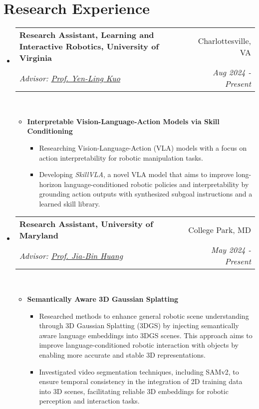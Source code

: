 \documentclass[letterpaper,11pt]{article}
\makeatletter
\newcommand{\Date}[1]{\textit{\small #1}}
\newcommand{\resumeSubheading}[4]{
  \item
    \begin{tabular*}{0.9798\textwidth}{l@{\extracolsep{\fill}}r} %
      \textbf{#1} & #2 \\
      \textit{\small#3} & \Date{#4} \\
    \end{tabular*}\
}
\makeatother
\begin{document}
\section{Research Experience}
\begin{itemize}
  \resumeSubheading{Research Assistant, Learning and Interactive Robotics, University of Virginia}{Charlottesville, VA}
  {Advisor: \href{https://yenlingkuo.com/}{Prof. Yen-Ling Kuo}}{Aug 2024 - Present}
  \begin{itemize}
    \item \textbf{Interpretable Vision-Language-Action Models via Skill Conditioning}
          \begin{itemize}
            \item Researching Vision-Language-Action (VLA) models with a focus on action interpretability for robotic manipulation tasks.
            \item Developing \textit{SkillVLA}, a novel VLA model that aims to improve long-horizon language-conditioned
                  robotic policies and interpretability by grounding action outputs with synthesized subgoal instructions and a learned skill library.
          \end{itemize}
  \end{itemize}

  \resumeSubheading{Research Assistant, University of Maryland}{College Park, MD}
  {Advisor: \href{https://jbhuang0604.github.io/}{Prof. Jia-Bin Huang}}{May 2024 - Present}
  \begin{itemize}
    \item \textbf{Semantically Aware 3D Gaussian Splatting}
          \begin{itemize}
            \item Researched methods to enhance general robotic scene understanding through 3D Gaussian Splatting (3DGS) by injecting semantically aware language embeddings into 3DGS scenes. This approach aims to improve language-conditioned robotic interaction with objects by enabling more accurate and stable 3D representations.
            \item Investigated video segmentation techniques, including SAMv2, to ensure temporal consistency in the integration of 2D training data into 3D scenes, facilitating reliable 3D embeddings for robotic perception and interaction tasks.
          \end{itemize}
  \end{itemize}


\end{itemize}
\end{document}
